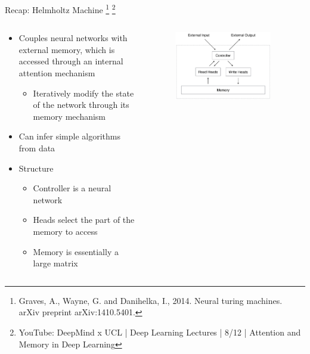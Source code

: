\documentclass[AERbeamer%
              ,optEnglish%
              ,optBiber%
              ,optBibstyleAlphabetic%
              ,optBeamerClassicFormat%
              ]{AERlatex}%
\begin{document}
\begin{frame}[c]{Recap: Helmholtz Machine \footnote{Graves, A., Wayne, G. and Danihelka, I., 2014. Neural turing machines. arXiv preprint arXiv:1410.5401.}
                                          \footnote{YouTube: DeepMind x UCL | Deep Learning Lectures | 8/12 | Attention and Memory in Deep Learning}}
    \centering
    \begin{columns}[T]
        \begin{column}{0.48\textwidth}
            \begin{itemize}
                \item Couples neural networks with external memory, which is accessed through an
                      internal attention mechanism
                \begin{itemize}
                    \item Iteratively modify the state of the network through its memory mechanism
                \end{itemize}
                \item Can infer simple algorithms from data
                \item Structure
                \begin{itemize}
                    \item Controller is a neural network
                    \item Heads select the part of the memory to access
                    \item Memory is essentially a large matrix
                \end{itemize}
            \end{itemize}
        \end{column}
        \begin{column}{0.48\textwidth}
            \begin{figure}
                \centering
                \includegraphics[width=0.9\textwidth]{NeuralTuringMachineArchitecture.png}
            \end{figure}
        \end{column}
    \end{columns}
\end{frame}
\end{document}
